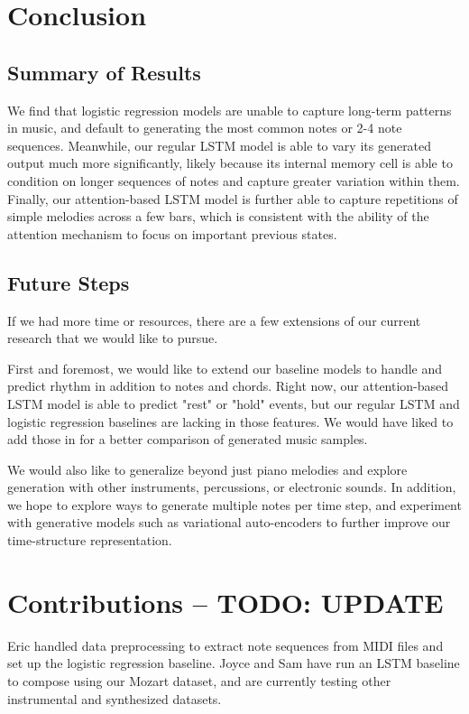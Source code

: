 \documentclass[twoside,twocolumn]{article}
\begin{document}
\section{Conclusion}

\subsection{Summary of Results}

We find that logistic regression models are unable to capture long-term patterns in music, and default to generating the most common notes or 2-4 note sequences. Meanwhile, our regular LSTM model is able to vary its generated output much more significantly, likely because its internal memory cell is able to condition on longer sequences of notes and capture greater variation within them. Finally, our attention-based LSTM model is further able to capture repetitions of simple melodies across a few bars, which is consistent with the ability of the attention mechanism to focus on important previous states. 


\subsection{Future Steps}
If we had more time or resources, there are a few extensions of our current research that we would like to pursue. 

First and foremost, we would like to extend our baseline models to handle and predict rhythm in addition to notes and chords. Right now, our attention-based LSTM model is able to predict "rest" or "hold" events, but our regular LSTM and logistic regression baselines are lacking in those features. We would have liked to add those in for a better comparison of generated music samples. 

We would also like to generalize beyond just piano melodies and explore generation with
other instruments, percussions, or electronic sounds. In addition, we hope to
explore ways to generate multiple notes per time step, and experiment with generative models such as variational auto-encoders to further improve our time-structure
representation.


\section{Contributions -- TODO: UPDATE}

Eric handled data preprocessing to extract note sequences from MIDI files and set up the logistic regression baseline. Joyce and Sam have run an LSTM baseline to compose using our Mozart dataset, and are currently testing other instrumental and synthesized datasets.






\end{document}

